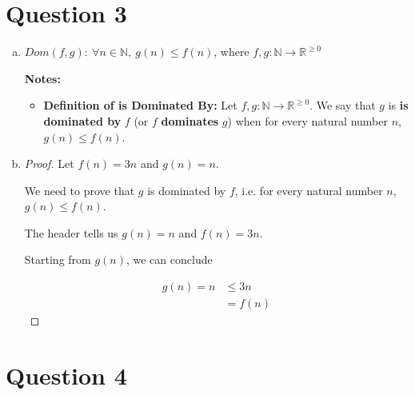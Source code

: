 \documentclass[12pt]{article}
\begin{document}
\section*{Question 3}
\begin{enumerate}[a.]
    \item $Dom(f,g):\:\forall n \in \mathbb{N},\:g(n) \leq f(n)$, where $f,g:\mathbb{N} \to \mathbb{R}^{\geq 0}$

    \bigskip

    \textbf{Notes:}

    \begin{itemize}
        \item \textbf{Definition of is Dominated By:} Let $f,g:\mathbb{N} \to
        \mathbb{R}^{\geq 0}$. We say that $g$ is \textbf{is dominated by} $f$
        (or $f$ \textbf{dominates} $g$) when for every natural number $n$, $g(n) \leq f(n)$.
    \end{itemize}

    \item

    \begin{proof}
    Let $f(n) = 3n$ and $g(n) = n$.

    \bigskip

    We need to prove that $g$ is dominated by $f$, i.e. for every natural number $n$,
    $g(n) \leq f(n)$.

    \bigskip

    The header tells us $g(n) = n$ and $f(n) = 3n$.

    \bigskip

    Starting from $g(n)$, we can conclude

    \setcounter{equation}{0}
    \begin{align}
        g(n) = n &\leq 3n\\
        &= f(n)
    \end{align}

    \end{proof}

\end{enumerate}

\section*{Question 4}
\end{document}
